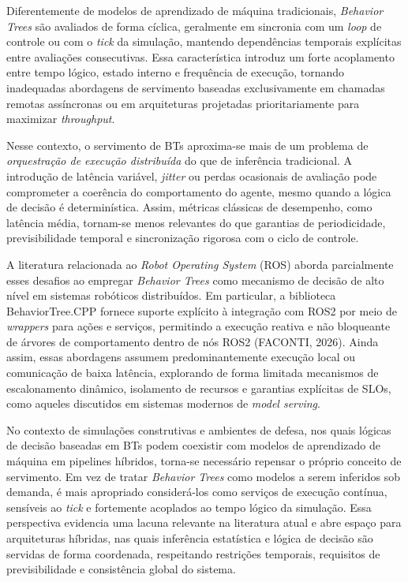 Diferentemente de modelos de aprendizado de máquina tradicionais, \emph{Behavior Trees} são avaliados de forma cíclica, geralmente em sincronia com um \emph{loop} de controle ou com o \emph{tick} da simulação, mantendo dependências temporais explícitas entre avaliações consecutivas. Essa característica introduz um forte acoplamento entre tempo lógico, estado interno e frequência de execução, tornando inadequadas abordagens de servimento baseadas exclusivamente em chamadas remotas assíncronas ou em arquiteturas projetadas prioritariamente para maximizar \emph{throughput}.

Nesse contexto, o servimento de BTs aproxima-se mais de um problema de \emph{orquestração de execução distribuída} do que de inferência tradicional. A introdução de latência variável, \emph{jitter} ou perdas ocasionais de avaliação pode comprometer a coerência do comportamento do agente, mesmo quando a lógica de decisão é determinística. Assim, métricas clássicas de desempenho, como latência média, tornam-se menos relevantes do que garantias de periodicidade, previsibilidade temporal e sincronização rigorosa com o ciclo de controle.

A literatura relacionada ao \emph{Robot Operating System} (ROS) aborda parcialmente esses desafios ao empregar \emph{Behavior Trees} como mecanismo de decisão de alto nível em sistemas robóticos distribuídos. Em particular, a biblioteca BehaviorTree.CPP fornece suporte explícito à integração com ROS2 por meio de \emph{wrappers} para ações e serviços, permitindo a execução reativa e não bloqueante de árvores de comportamento dentro de nós ROS2 (FACONTI, 2026). Ainda assim, essas abordagens assumem predominantemente execução local ou comunicação de baixa latência, explorando de forma limitada mecanismos de escalonamento dinâmico, isolamento de recursos e garantias explícitas de SLOs, como aqueles discutidos em sistemas modernos de \emph{model serving}.

No contexto de simulações construtivas e ambientes de defesa, nos quais lógicas de decisão baseadas em BTs podem coexistir com modelos de aprendizado de máquina em pipelines híbridos, torna-se necessário repensar o próprio conceito de servimento. Em vez de tratar \emph{Behavior Trees} como modelos a serem inferidos sob demanda, é mais apropriado considerá-los como serviços de execução contínua, sensíveis ao \emph{tick} e fortemente acoplados ao tempo lógico da simulação. Essa perspectiva evidencia uma lacuna relevante na literatura atual e abre espaço para arquiteturas híbridas, nas quais inferência estatística e lógica de decisão são servidas de forma coordenada, respeitando restrições temporais, requisitos de previsibilidade e consistência global do sistema.

